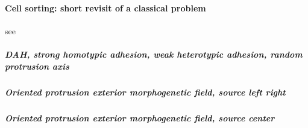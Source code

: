 \paragraph{Cell sorting: short revisit of a classical problem}  see \cite{Zhang:2011ca}

\subparagraph{DAH, strong homotypic adhesion, weak heterotypic adhesion, random protrusion axis}


\subparagraph{Oriented protrusion exterior morphogenetic field, source left right}


\subparagraph{Oriented protrusion exterior morphogenetic field, source center}






























